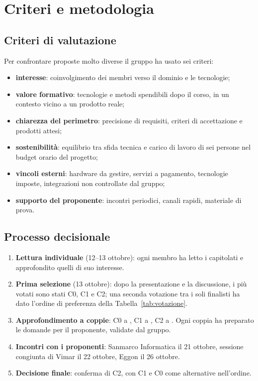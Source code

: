 
\section{Criteri e metodologia}\label{sec:metodologia}

\subsection{Criteri di valutazione}
Per confrontare proposte molto diverse il gruppo ha usato sei criteri:
\begin{itemize}
  \item \textbf{interesse}: coinvolgimento dei membri verso il dominio e le
        tecnologie;
  \item \textbf{valore formativo}: tecnologie e metodi spendibili dopo il
        corso, in un contesto vicino a un prodotto reale;
  \item \textbf{chiarezza del perimetro}: precisione di requisiti, criteri
        di accettazione e prodotti attesi;
  \item \textbf{sostenibilità}: equilibrio tra sfida tecnica e carico di
        lavoro di sei persone nel budget orario del progetto;
  \item \textbf{vincoli esterni}: hardware da gestire, servizi a pagamento,
        tecnologie imposte, integrazioni non controllate dal gruppo;
  \item \textbf{supporto del proponente}: incontri periodici, canali
        rapidi, materiale di prova.
\end{itemize}

\subsection{Processo decisionale}
\begin{enumerate}
  \item \textbf{Lettura individuale} (12--13 ottobre): ogni membro ha letto
        i capitolati e approfondito quelli di suo interesse.
  \item \textbf{Prima selezione} (13 ottobre): dopo la presentazione e la
        discussione, i più votati sono stati C0, C1 e C2; una seconda
        votazione tra i soli finalisti ha dato l'ordine di preferenza della
        Tabella~\ref{tab:votazione}.
  \item \textbf{Approfondimento a coppie}: C0 a , C1
        a , C2 a . Ogni
        coppia ha preparato le domande per il proponente, validate dal
        gruppo.
  \item \textbf{Incontri con i proponenti}: Sanmarco Informatica il 21
        ottobre, sessione congiunta di Vimar il 22 ottobre, Eggon il 26
        ottobre.
  \item \textbf{Decisione finale}: conferma di C2, con C1 e C0 come
        alternative nell'ordine.
\end{enumerate}

